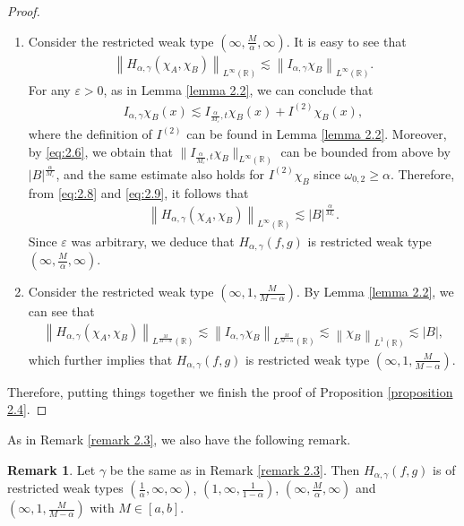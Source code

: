\documentclass[11pt, twoside, leqno]{article}
\theoremstyle{definition}
\newtheorem{remark}[theorem]{Remark}
\numberwithin{equation}{section}
\begin{document}
\begin{proof}
\begin{enumerate}
  \item[$\star$] Consider the restricted weak type $(\infty,{\frac{M}{\alpha}},\infty)$. It is easy to see that
  \begin{align}\label{eq:2.8}
  \left\|H_{\alpha,\gamma}(\chi_{A},\chi_{B})\right\|_{L^{\infty}(\mathbb{R})}
  \lesssim  \left\|I_{\alpha,\gamma}\chi_{B}\right\|_{L^{\infty}(\mathbb{R})} .
  \end{align}
  For any $\varepsilon>0$, as in Lemma \ref{lemma 2.2}, we can conclude that
  \begin{align}\label{eq:2.9}
  I_{\alpha,\gamma}\chi_{B}(x) \lesssim I_{\frac{\alpha}{M_{\varepsilon}},t}\chi_{B}(x) +I^{(2)}\chi_{B}(x),
  \end{align}
  where the definition of $I^{(2)}$ can be found in Lemma \ref{lemma 2.2}. Moreover, by \eqref{eq:2.6}, we obtain that $\|I_{\frac{\alpha}{M_{\varepsilon}},t}\chi_{B}\|_{L^{\infty}(\mathbb{R})}$ can be bounded from above by $|B|^{\frac{\alpha}{M_{\varepsilon}}}$, and the same estimate also holds for $I^{(2)}\chi_{B}$ since $\omega_{0,2}\geq \alpha$. Therefore, from \eqref{eq:2.8} and \eqref{eq:2.9}, it follows that
  \begin{align*}
  \left\|H_{\alpha,\gamma}(\chi_{A},\chi_{B})\right\|_{L^{\infty}(\mathbb{R})}
  \lesssim  |B|^{\frac{\alpha}{M_{\varepsilon}}}.
  \end{align*}
  Since $\varepsilon$ was arbitrary, we deduce that $H_{\alpha,\gamma}(f,g)$ is restricted weak type $(\infty,{\frac{M}{\alpha}},\infty)$.

  \item[$\star$] Consider the restricted weak type $(\infty,1,{\frac{M}{M-\alpha}})$. By Lemma \ref{lemma 2.2}, we can see that
 \begin{align*}
\left \|H_{\alpha,\gamma}(\chi_{A},\chi_{B})\right\|_{L^{\frac{M}{M-\alpha}}(\mathbb{R})}
\lesssim  \left \|I_{\alpha,\gamma}\chi_{B}\right\|_{L^{\frac{M}{M-\alpha}}(\mathbb{R})}\lesssim  \left \|\chi_{B}\right\|_{L^1(\mathbb{R})}\lesssim |B|,
\end{align*}
which further implies that $H_{\alpha,\gamma}(f,g)$ is restricted weak type $(\infty,1,{\frac{M}{M-\alpha}})$.
\end{enumerate}
Therefore, putting things together we finish the proof of Proposition \ref{proposition 2.4}.
\end{proof}

As in Remark \ref{remark 2.3}, we also have the following remark.

\begin{remark}\label{remark 2.5}
Let $\gamma $ be the same as in Remark \ref{remark 2.3}. Then $H_{\alpha,\gamma}(f,g)$  is of restricted weak types $({\frac{1}{\alpha}},\infty,\infty)$, $(1,\infty,{\frac{1}{1-\alpha}})$, $(\infty,{\frac{M}{\alpha}},\infty)$ and $(\infty,1,{\frac{M}{M-\alpha}})$ with $M\in [a, b]$.
\end{remark}
\end{document}
